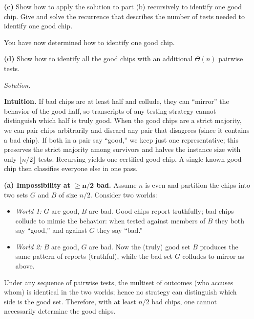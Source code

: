 \documentclass[12pt]{article}
\theoremstyle{definition}
\begin{document}
\noindent\textbf{(c)} Show how to apply the solution to part (b) recursively to identify one good chip. Give and solve the recurrence that describes the number of tests needed to identify one good chip.

\smallskip
You have now determined how to identify one good chip.

\noindent\textbf{(d)} Show how to identify all the good chips with an additional $\Theta(n)$ pairwise tests.

\medskip
\noindent\textit{Solution.}

\medskip
\noindent\textbf{Intuition.}
If bad chips are at least half and collude, they can “mirror” the behavior of the good half, so transcripts of any testing strategy cannot distinguish which half is truly good.  
When the good chips are a strict majority, we can pair chips arbitrarily and discard any pair that disagrees (since it contains a bad chip). If both in a pair say “good,” we keep just one representative; this preserves the strict majority among survivors and halves the instance size with only $\lfloor n/2\rfloor$ tests. Recursing yields one certified good chip. A single known-good chip then classifies everyone else in one pass.

\medskip
\noindent\textbf{(a) Impossibility at $\boldsymbol{\ge n/2}$ bad.}
Assume $n$ is even and partition the chips into two sets $G$ and $B$ of size $n/2$. Consider two worlds:

\begin{itemize}
\item \emph{World 1:} $G$ are good, $B$ are bad. Good chips report truthfully; bad chips collude to mimic the behavior: when tested against members of $B$ they both say “good,” and against $G$ they say “bad.”
\item \emph{World 2:} $B$ are good, $G$ are bad. Now the (truly) good set $B$ produces the same pattern of reports (truthful), while the bad set $G$ colludes to mirror as above.
\end{itemize}

Under any sequence of pairwise tests, the multiset of outcomes (who accuses whom) is identical in the two worlds; hence no strategy can distinguish which side is the good set. Therefore, with at least $n/2$ bad chips, one cannot necessarily determine the good chips.
\end{document}
